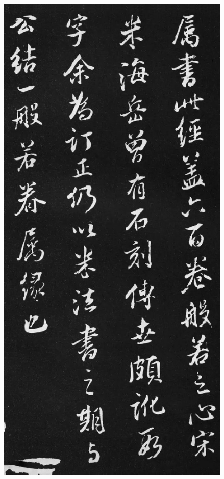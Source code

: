 \documentclass[a4paper,twoside]{article}
\begin{document}
\begin{figure}[ht]
\centering
\includegraphics[width=11.2cm]{images/dongqichang-8}
\end{figure}
\end{document}
